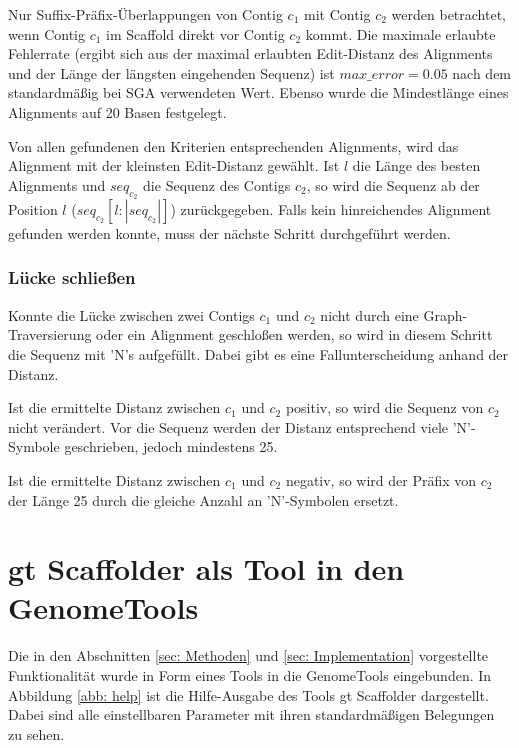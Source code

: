\documentclass[a4paper,10pt,parskip]{scrartcl}
\begin{document}
Nur Suffix-Präfix-Überlappungen von Contig $c_1$ mit Contig $c_2$
werden betrachtet, wenn Contig $c_1$ im Scaffold direkt vor Contig
$c_2$ kommt. Die maximale erlaubte Fehlerrate (ergibt sich aus der
maximal erlaubten Edit-Distanz des Alignments und der Länge der
längsten eingehenden Sequenz) ist $max\_error = 0.05$ nach dem
standardmäßig bei SGA verwendeten Wert. Ebenso wurde die Mindestlänge
eines Alignments auf 20 Basen festgelegt.

Von allen gefundenen den Kriterien entsprechenden Alignments, wird das
Alignment mit der kleinsten Edit-Distanz gewählt. Ist $l$ die Länge
des besten Alignments und $seq_{c_2}$ die Sequenz des Contigs $c_2$,
so wird die Sequenz ab der Position $l$ ($seq_{c_2}[l:|seq_{c_2}|]$)
zurückgegeben. Falls kein hinreichendes Alignment gefunden werden
konnte, muss der nächste Schritt durchgeführt werden.

\subsubsection{Lücke schließen}
Konnte die Lücke zwischen zwei Contigs $c_1$ und $c_2$ nicht durch
eine Graph-Traversierung oder ein Alignment geschloßen werden, so wird
in diesem Schritt die Sequenz mit 'N's aufgefüllt. Dabei gibt es eine
Fallunterscheidung anhand der Distanz.

Ist die ermittelte Distanz zwischen $c_1$ und $c_2$ positiv, so wird
die Sequenz von $c_2$ nicht verändert. Vor die Sequenz werden der
Distanz entsprechend viele 'N'-Symbole geschrieben, jedoch mindestens
25.

Ist die ermittelte Distanz zwischen $c_1$ und $c_2$ negativ, so wird
der Präfix von $c_2$ der Länge 25 durch die gleiche Anzahl an
'N'-Symbolen ersetzt.

\section{gt Scaffolder als Tool in den GenomeTools}
Die in den Abschnitten \ref{sec: Methoden} und \ref{sec:
  Implementation} vorgestellte Funktionalität wurde in Form eines
Tools in die GenomeTools eingebunden. In Abbildung \ref{abb: help} ist
die Hilfe-Ausgabe des Tools gt Scaffolder dargestellt. Dabei sind alle
einstellbaren Parameter mit ihren standardmäßigen Belegungen zu sehen.
\end{document}
